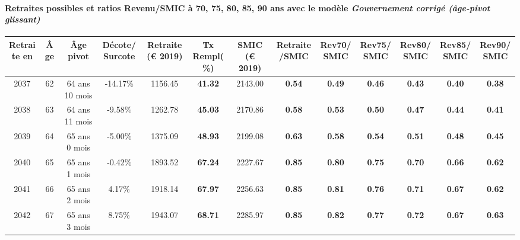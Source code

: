\paragraph{Retraites possibles et ratios Revenu/SMIC à 70, 75, 80, 85, 90 ans avec le modèle \emph{Gouvernement corrigé (âge-pivot glissant)}}  
 
{ \scriptsize \begin{center} 
\begin{tabular}[htb]{|c|c||c|c||c|c||c||c|c|c|c|c|c|} 
\hline 
 Retraite en &  Âge &  Âge pivot &  Décote/Surcote &  Retraite (\euro{} 2019) &  Tx Rempl(\%) &  SMIC (\euro{} 2019) &  Retraite/SMIC &  Rev70/SMIC &  Rev75/SMIC &  Rev80/SMIC &  Rev85/SMIC &  Rev90/SMIC \\ 
\hline \hline 
 2037 &  62 &  64 ans 10 mois &  -14.17\% &  1156.45 &  {\bf 41.32} &  2143.00 &  {\bf {\color{red} 0.54}} &  {\bf {\color{red} 0.49}} &  {\bf {\color{red} 0.46}} &  {\bf {\color{red} 0.43}} &  {\bf {\color{red} 0.40}} &  {\bf {\color{red} 0.38}} \\ 
\hline 
 2038 &  63 &  64 ans 11 mois &  -9.58\% &  1262.78 &  {\bf 45.03} &  2170.86 &  {\bf {\color{red} 0.58}} &  {\bf {\color{red} 0.53}} &  {\bf {\color{red} 0.50}} &  {\bf {\color{red} 0.47}} &  {\bf {\color{red} 0.44}} &  {\bf {\color{red} 0.41}} \\ 
\hline 
 2039 &  64 &  65 ans 0 mois &  -5.00\% &  1375.09 &  {\bf 48.93} &  2199.08 &  {\bf {\color{red} 0.63}} &  {\bf {\color{red} 0.58}} &  {\bf {\color{red} 0.54}} &  {\bf {\color{red} 0.51}} &  {\bf {\color{red} 0.48}} &  {\bf {\color{red} 0.45}} \\ 
\hline 
 2040 &  65 &  65 ans 1 mois &  -0.42\% &  1893.52 &  {\bf 67.24} &  2227.67 &  {\bf {\color{red} 0.85}} &  {\bf {\color{red} 0.80}} &  {\bf {\color{red} 0.75}} &  {\bf {\color{red} 0.70}} &  {\bf {\color{red} 0.66}} &  {\bf {\color{red} 0.62}} \\ 
\hline 
 2041 &  66 &  65 ans 2 mois &  4.17\% &  1918.14 &  {\bf 67.97} &  2256.63 &  {\bf {\color{red} 0.85}} &  {\bf {\color{red} 0.81}} &  {\bf {\color{red} 0.76}} &  {\bf {\color{red} 0.71}} &  {\bf {\color{red} 0.67}} &  {\bf {\color{red} 0.62}} \\ 
\hline 
 2042 &  67 &  65 ans 3 mois &  8.75\% &  1943.07 &  {\bf 68.71} &  2285.97 &  {\bf {\color{red} 0.85}} &  {\bf {\color{red} 0.82}} &  {\bf {\color{red} 0.77}} &  {\bf {\color{red} 0.72}} &  {\bf {\color{red} 0.67}} &  {\bf {\color{red} 0.63}} \\ 
\hline 
\hline 
\end{tabular} 
\end{center} } 

